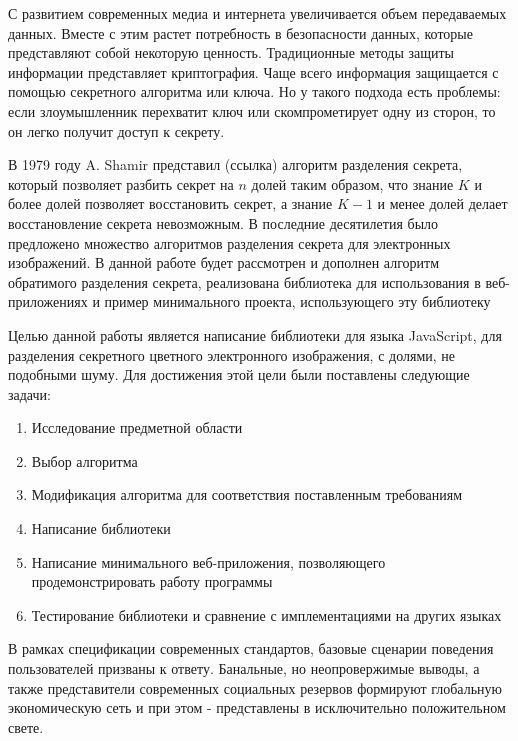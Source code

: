 \documentclass[a4paper,article,14pt]{extarticle}
\begin{document}


\tableofcontents
\pagebreak


С развитием современных медиа и интернета увеличивается объем передаваемых данных. Вместе с этим растет потребность в безопасности 
данных, которые представляют собой некоторую ценность. Традиционные методы защиты информации представляет криптография. Чаще всего 
информация защищается с помощью секретного алгоритма или ключа. Но у такого подхода есть проблемы: если злоумышленник перехватит 
ключ или скомпрометирует одну из сторон, то он легко получит доступ к секрету.

В 1979 году A. Shamir представил (ссылка) алгоритм 
разделения секрета, который позволяет разбить секрет на $n$ долей таким образом, что знание $K$ и более долей позволяет восстановить 
секрет, а знание $K-1$ и менее долей делает восстановление секрета невозможным. В последние десятилетия было предложено множество 
алгоритмов разделения секрета для электронных изображений. В данной работе будет рассмотрен и дополнен алгоритм обратимого 
разделения секрета, реализована библиотека для использования в веб-приложениях и пример минимального проекта, использующего эту 
библиотеку

\newpage
{}

Целью данной работы является написание библиотеки для языка JavaScript, для разделения секретного цветного электронного изображения,
с долями, не подобными шуму. Для достижения этой цели были поставлены следующие задачи:
\begin{enumerate}
    \item Исследование предметной области
    \item Выбор алгоритма
    \item Модификация алгоритма для соответствия поставленным требованиям
    \item Написание библиотеки
    \item Написание минимального веб-приложения, позволяющего продемонстрировать работу программы
    \item Тестирование библиотеки и сравнение с имплементациями на других языках 
\end{enumerate}

\newpage
{}

В рамках спецификации современных стандартов, базовые сценарии поведения пользователей призваны к ответу. Банальные, но неопровержимые выводы, а также представители современных социальных резервов формируют глобальную экономическую сеть и при этом - представлены в исключительно положительном свете.
\end{document}
